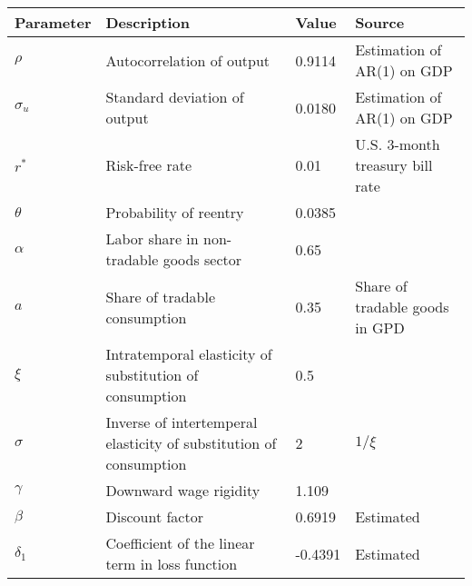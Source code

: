\begin{table}[h]
    \centering
    \begin{tabular}{@{}llll@{}}
        \toprule
    Parameter  & Description                                                       & Value  & Source                                                                         \\ \midrule
    $\rho$     & Autocorrelation of output                                         & 0.9114  & Estimation of AR(1) on GDP\\
    $\sigma_u$ & Standard deviation of output                                      & 0.0180 & Estimation of AR(1) on GDP \\
    $r^*$      & Risk-free rate                                                    & 0.01 & U.S. 3-month treasury bill rate \\
    $\theta$   & Probability of reentry                                            & 0.0385 & \citet*{Chatterjee-12}                                              \\
    $\alpha$   & Labor share in non-tradable goods sector                          & 0.65   & \citet{Jegajeevan-Sri-Lanka-DSGE}                                                       \\
    $a$        & Share of tradable consumption                                     & 0.35   & Share of tradable goods in GPD                  \\
    $\xi$      & Intratemporal elasticity of substitution of consumption & 0.5   & \citet{Na-18}                             \\
    $\sigma$   & Inverse of intertemperal elasticity of substitution of consumption  & 2   & $1 / \xi$                                                                      \\
    $\gamma$   & Downward wage rigidity                                            & 1.109   & \citet*{wage-rigidity-data}                  \\
    $\beta$    & Discount factor                                                   & 0.6919  &  Estimated                                                                              \\
    $\delta_1$ & Coefficient of the linear term in loss function                   &  -0.4391 &   Estimated                                                                             \\

\end{tabular}
\end{table}
